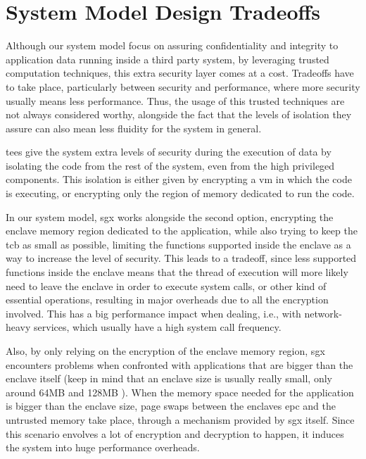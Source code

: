   
\section{System Model Design Tradeoffs}
\label{sec:design_tradeoffs}

Although our system model focus on assuring confidentiality and integrity to application data running inside a third party system, by leveraging trusted computation techniques, this extra security layer comes at a cost. Tradeoffs have to take place, particularly between security and performance, where more security usually means less performance. 
Thus, the usage of this trusted techniques are not always considered worthy, alongside the fact that the levels of isolation they assure can also mean less fluidity for the system in general.  

\gls{tee}s give the system extra levels of security during the execution of data by isolating the code from the rest of the system, even from the high privileged components. This isolation is either given by encrypting a \gls{vm} in which the code is executing, or encrypting only the region of memory dedicated to run the code. 

In our system model, \gls{sgx} works alongside the second option, encrypting the enclave memory region dedicated to the application, while also trying to keep the \gls{tcb} as small as possible, limiting the functions supported inside the enclave as a way to increase the level of security. 
This leads to a tradeoff, since less supported functions inside the enclave means that the thread of execution will more likely need to leave the enclave in order to execute system calls, or other kind of essential operations, resulting in major overheads due to all the encryption involved. This has a big performance impact when dealing, i.e., with network-heavy services, which usually have a high system call frequency.

Also, by only relying on the encryption of the enclave memory region, \gls{sgx} encounters problems when confronted with applications that are bigger than the enclave itself (keep in mind that an enclave size is usually really small, only around 64MB and 128MB \cite{sconePaper}). 
When the memory space needed for the application is bigger than the enclave size, page swaps between the enclaves \gls{epc} and the untrusted memory take place, through a mechanism provided by \gls{sgx} itself. Since this scenario envolves a lot of encryption and decryption to happen, it induces the system into huge performance overheads.

